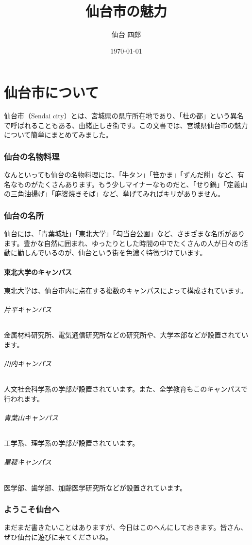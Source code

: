 \documentclass[titlepage]{ltjsarticle}
\title{仙台市の魅力}
\author{仙台 四郎}
\date{\today}
\begin{document}
\maketitle
\tableofcontents
\newpage
\part{仙台市について}
仙台市（Sendai city）とは、宮城県の県庁所在地であり、「杜の都」という異名で呼ばれることもある、由緒正しき街です。この文書では、宮城県仙台市の魅力について簡単にまとめてみました。

\section{仙台の名物料理}
なんといっても仙台の名物料理には、「牛タン」「笹かま」「ずんだ餅」など、有名なものがたくさんあります。もう少しマイナーなものだと、「せり鍋」「定義山の三角油揚げ」「麻婆焼きそば」など、挙げてみればキリがありません。

\section{仙台の名所}
仙台には、「青葉城址」「東北大学」「勾当台公園」など、さまざまな名所があります。豊かな自然に囲まれ、ゆったりとした時間の中でたくさんの人が日々の活動に勤しんでいるのが、仙台という街を色濃く特徴づけています。
\subsection{東北大学のキャンパス}
東北大学は、仙台市内に点在する複数のキャンパスによって構成されています。
\paragraph{片平キャンパス}
金属材料研究所、電気通信研究所などの研究所や、大学本部などが設置されています。
\paragraph{川内キャンパス}
人文社会科学系の学部が設置されています。また、全学教育もこのキャンパスで行われます。
\paragraph{青葉山キャンパス}
工学系、理学系の学部が設置されています。
\paragraph{星稜キャンパス}
医学部、歯学部、加齢医学研究所などが設置されています。

\section{ようこそ仙台へ}
まだまだ書きたいことはありますが、今日はこのへんにしておきます。皆さん、ぜひ仙台に遊びに来てくださいね。
\end{document}
